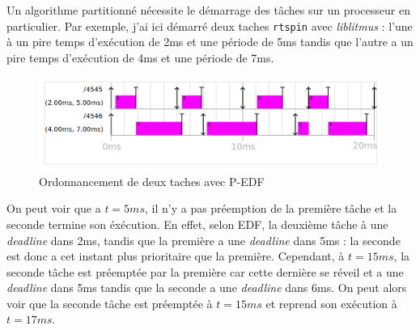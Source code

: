 Un algorithme partitionné nécessite le démarrage des tâches sur un processeur en particulier. Par exemple, j'ai ici démarré deux taches \texttt{rtspin} avec \textit{liblitmus} : l'une à un pire temps d’exécution de 2ms et une période de 5ms tandis que l'autre a un pire temps d’exécution de 4ms et une période de 7ms.

\begin{figure}[H]
    \centering
    \includegraphics[width=0.5\paperwidth]{Images/P-EDF-SCHEDUALIBILITY-DEMO.png}
    \caption{Ordonnancement de deux taches avec P-EDF}
\end{figure}

On peut voir que a $t=5ms$, il n'y a pas préemption de la première tâche et la seconde termine son éxécution. En effet, selon EDF, la deuxième tâche à une \textit{deadline} dans 2ms, tandis que la première a une \textit{deadline} dans 5ms : la seconde est donc a cet instant plus prioritaire que la première. Cependant, à $t=15ms$, la seconde tâche est préemptée par la première car cette dernière se réveil et a une \textit{deadline} dans 5ms tandis que la seconde a une \textit{deadline} dans 6ms. On peut alors voir que la seconde tâche est préemptée à $t=15ms$ et reprend son exécution à $t=17ms$. 